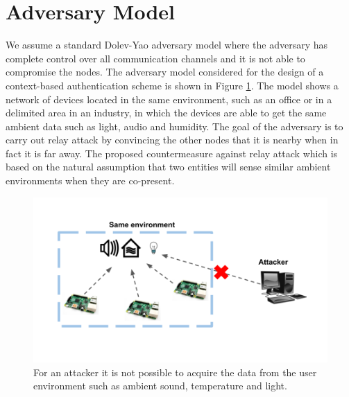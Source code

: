 \section{Adversary Model}
We assume a standard Dolev-Yao adversary model \cite{Dolev1981OriginalProtocols} where the adversary has complete control over all communication channels and it is not able to compromise the nodes. 
The adversary model considered for the design of a context-based authentication scheme is shown in Figure \ref{fig_environmentAttack}.
The model shows a network of devices located in the same environment, such as an office or in a delimited area in an industry, in which the devices are able to get the same ambient data such as light, audio and humidity. 
The goal of the adversary is to carry out relay attack by convincing the other nodes that it is nearby when in fact it is far away. 
The proposed countermeasure against relay attack which is based on the natural  assumption  that  two  entities  will  sense  similar ambient environments when they are co-present.
\begin{figure}[!h]
\centering
\includegraphics[width=5in]{images/environmentAttack.png}
\caption{For an attacker it is not possible to acquire the data from the user environment such as ambient sound, temperature and light.}
\label{fig_environmentAttack}
\end{figure}